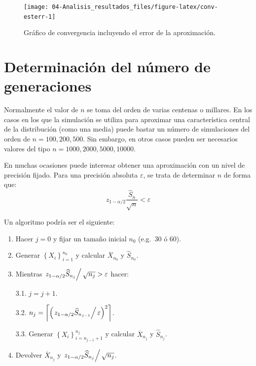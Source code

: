 \documentclass[
]{book}
\theoremstyle{break}
\theoremstyle{definition}
\theoremstyle{definition}
\theoremstyle{definition}
\theoremstyle{definition}
\theoremstyle{remark}
\begin{document}
\begin{figure}[!htb]

{\centering \texttt{[image: 04-Analisis\_resultados\_files/figure-latex/conv-esterr-1]} 

}

\caption{Gráfico de convergencia incluyendo el error de la aproximación.}\label{fig:conv-esterr}
\end{figure}

\hypertarget{determinaciuxf3n-del-nuxfamero-de-generaciones}{%
\section{Determinación del número de generaciones}\label{determinaciuxf3n-del-nuxfamero-de-generaciones}}

Normalmente el valor de \(n\) se toma del orden de varias centenas o millares.
En los casos en los que la simulación se utiliza para aproximar una característica central de la distribución (como una media) puede bastar un número de simulaciones del orden de \(n = 100, 200, 500\).
Sin embargo, en otros casos pueden ser necesarios valores del tipo \(n = 1000, 2000, 5000, 10000\).

En muchas ocasiones puede interesar obtener una aproximación con un nivel de precisión fijado.
Para una precisión absoluta \(\varepsilon\), se trata de determinar
\(n\) de forma que:
\[z_{1-\alpha /2}\dfrac{\widehat{S}_{n}}{\sqrt{n}}<\varepsilon\]

Un algoritmo podría ser el siguiente:

\begin{enumerate}
\def\labelenumi{\arabic{enumi}.}
\item
  Hacer \(j=0\)
  y fijar un tamaño inicial \(n_{0}\) (e.g.~30 ó 60).
\item
  Generar \(\left\{ X_{i}\right\} _{i=1}^{n_{0}}\)
  y calcular \(\overline{X}_{n_0}\) y \(\widehat{S}_{n_{0}}\).
\item
  Mientras \(\left. z_{1-\alpha /2}\widehat{S}_{n_j}\right/ \sqrt{n_{j}}>\varepsilon\) hacer:

  3.1. \(j=j+1\).

  3.2. \(n_{j}=\left\lceil \left( \left. z_{1-\alpha /2}\widehat{S}  _{n_{j-1}}\right/ \varepsilon \right)^{2}\right\rceil\).

  3.3. Generar \(\left\{ X_{i}\right\}_{i=n_{j-1}+1}^{n_j}\)
  y calcular \(\overline{X}_{n_j}\) y \(\widehat{S}_{n_j}\).
\item
  Devolver \(\overline{X}_{n_j}\) y \(\left. z_{1-\alpha /2}\widehat{S}_{n_j}\right/ \sqrt{n_{j}}\).
\end{enumerate}
\end{document}
